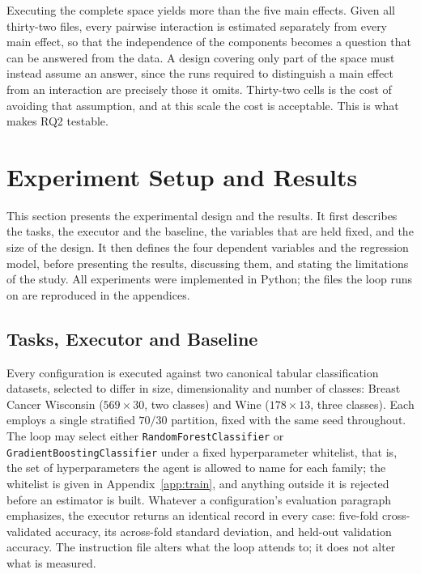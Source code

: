 \documentclass[11pt]{article}
\begin{document}
Executing the complete space yields more than the five main effects. Given all thirty-two files, every pairwise interaction is estimated separately from every main effect, so that the independence of the components becomes a question that can be answered from the data. A design covering only part of the space must instead assume an answer, since the runs required to distinguish a main effect from an interaction are precisely those it omits. Thirty-two cells is the cost of avoiding that assumption, and at this scale the cost is acceptable. This is what makes RQ2 testable.


\section{Experiment Setup and Results}
\label{sec:eval}

This section presents the experimental design and the results. It first describes the tasks, the executor and the baseline, the variables that are held fixed, and the size of the design. It then defines the four dependent variables and the regression model, before presenting the results, discussing them, and stating the limitations of the study. All experiments were implemented in Python; the files the loop runs on are reproduced in the appendices.

\subsection{Tasks, Executor and Baseline}

Every configuration is executed against two canonical tabular classification datasets, selected to differ in size, dimensionality and number of classes: Breast Cancer Wisconsin ($569 \times 30$, two classes) and Wine ($178 \times 13$, three classes). Each employs a single stratified $70/30$ partition, fixed with the same seed throughout. The loop may select either \texttt{RandomForestClassifier} or \texttt{GradientBoostingClassifier} under a fixed hyperparameter whitelist, that is, the set of hyperparameters the agent is allowed to name for each family; the whitelist is given in Appendix~\ref{app:train}, and anything outside it is rejected before an estimator is built. Whatever a configuration's evaluation paragraph emphasizes, the executor returns an identical record in every case: five-fold cross-validated accuracy, its across-fold standard deviation, and held-out validation accuracy. The instruction file alters what the loop attends to; it does not alter what is measured.
\end{document}
